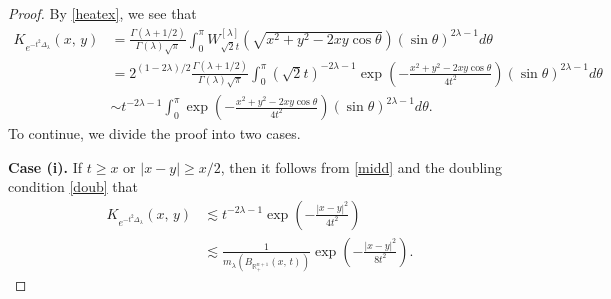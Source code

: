 \documentclass[12pt]{amsart}
\begin{document}
\begin{proof}
By \eqref{heatex}, we see that
\begin{align}
K_{e^{-t^2 \Delta_\lambda}}(x,\,y)
&=\frac{\Gamma(\lambda+1/2)}{\Gamma(\lambda)\sqrt{\pi}}\int_0^\pi W_{\sqrt{2}t}^{[\lambda]}(\sqrt{x^2+y^2-2xy\cos\theta})(\sin\theta)^{2\lambda-1}d\theta\nonumber\\
&=2^{(1-2\lambda)/2}\frac{\Gamma(\lambda+1/2)}{\Gamma(\lambda)\sqrt{\pi}}\int_0^\pi (\sqrt{2}t)^{-2\lambda-1}\exp\left(-\frac{x^2+y^2-2xy\cos\theta}{4t^2}\right)(\sin\theta)^{2\lambda-1}d\theta\label{middd}\\
&\sim t^{-2\lambda-1}\int_0^\pi \exp\left(-\frac{x^2+y^2-2xy\cos\theta}{4t^2}\right)(\sin\theta)^{2\lambda-1}d\theta.\label{midd}
\end{align}
To continue, we divide the proof into two cases.

{\bf Case (i).} If $t\geq x$ or $|x-y|\geq x/2$, then it follows from \eqref{midd} and the doubling condition \eqref{doub} that
\begin{align*}
K_{e^{-t^2 \Delta_\lambda}}(x,\,y)&\lesssim t^{-2\lambda-1} \exp\left(-\frac{|x-y|^2}{4t^2}\right)\\
&\lesssim \frac{1}{m_\lambda(B_{\mathbb{R}_+^{n+1}}(x,\,t))}\exp\left(-\frac{|x-y|^2}{8t^2}\right).
\end{align*}


\end{proof}
\end{document}
